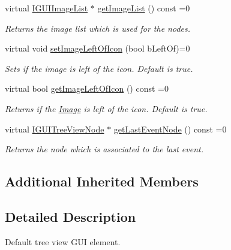 \begin{DoxyCompactItemize}
virtual \hyperlink{classirr_1_1gui_1_1IGUIImageList}{I\+G\+U\+I\+Image\+List} $\ast$ \hyperlink{classirr_1_1gui_1_1IGUITreeView_aeae0fa8b33064209ddc604aec45d461c}{get\+Image\+List} () const =0
\begin{DoxyCompactList}\small\item\em Returns the image list which is used for the nodes. \end{DoxyCompactList}\item 
\mbox{\label{classirr_1_1gui_1_1IGUITreeView_afb011310d69f466ed6a4955d0c7d3697}} 
virtual void \hyperlink{classirr_1_1gui_1_1IGUITreeView_afb011310d69f466ed6a4955d0c7d3697}{set\+Image\+Left\+Of\+Icon} (bool b\+Left\+Of)=0
\begin{DoxyCompactList}\small\item\em Sets if the image is left of the icon. Default is true. \end{DoxyCompactList}\item 
\mbox{\label{classirr_1_1gui_1_1IGUITreeView_a337b850f96abaecf7dae44f810f3bbed}} 
virtual bool \hyperlink{classirr_1_1gui_1_1IGUITreeView_a337b850f96abaecf7dae44f810f3bbed}{get\+Image\+Left\+Of\+Icon} () const =0
\begin{DoxyCompactList}\small\item\em Returns if the \hyperlink{classImage}{Image} is left of the icon. Default is true. \end{DoxyCompactList}\item 
virtual \hyperlink{classirr_1_1gui_1_1IGUITreeViewNode}{I\+G\+U\+I\+Tree\+View\+Node} $\ast$ \hyperlink{classirr_1_1gui_1_1IGUITreeView_acddfaf6a9b418100d0ec42df52874765}{get\+Last\+Event\+Node} () const =0
\begin{DoxyCompactList}\small\item\em Returns the node which is associated to the last event. \end{DoxyCompactList}\end{DoxyCompactItemize}
\subsection*{Additional Inherited Members}


\subsection{Detailed Description}
Default tree view G\+UI element. 

